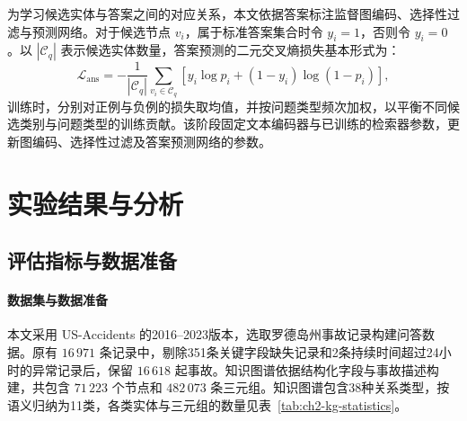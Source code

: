 为学习候选实体与答案之间的对应关系，本文依据答案标注监督图编码、选择性过滤与预测网络。对于候选节点 $v_i$，属于标准答案集合时令 $y_i=1$，否则令 $y_i=0$。以 $|\mathcal{C}_q|$ 表示候选实体数量，答案预测的二元交叉熵损失基本形式为：
\begin{equation}
\mathcal{L}_{\mathrm{ans}}
=-\frac{1}{|\mathcal{C}_q|}
\sum_{v_i\in\mathcal{C}_q}
\left[y_i\log p_i+(1-y_i)\log(1-p_i)\right],
\end{equation}
训练时，分别对正例与负例的损失取均值，并按问题类型频次加权，以平衡不同候选类别与问题类型的训练贡献。该阶段固定文本编码器与已训练的检索器参数，更新图编码、选择性过滤及答案预测网络的参数。

\section{实验结果与分析}

\begingroup
\renewcommand{\thetable}{\thechapter-\arabic{table}}
\renewcommand{\arraystretch}{1.18}
\setlength{\tabcolsep}{4pt}

\subsection{评估指标与数据准备}

\paragraph{数据集与数据准备}

本文采用 US-Accidents\cite{moosavi2019countrywide} 的2016--2023版本，选取罗德岛州事故记录构建问答数据。原有 $16\,971$ 条记录中，剔除351条关键字段缺失记录和2条持续时间超过24小时的异常记录后，保留 $16\,618$ 起事故。知识图谱依据结构化字段与事故描述构建，共包含 $71\,223$ 个节点和 $482\,073$ 条三元组。知识图谱包含38种关系类型，按语义归纳为11类，各类实体与三元组的数量见表~\ref{tab:ch2-kg-statistics}。

